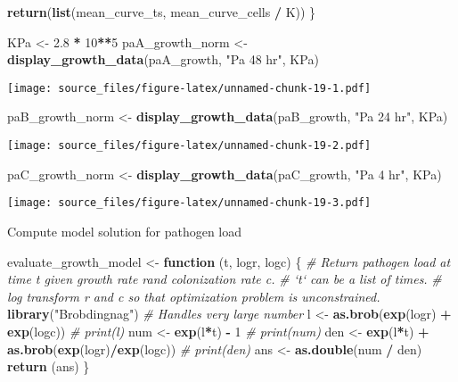 \documentclass[]{article}
\newenvironment{Shaded}{\begin{snugshade}}{\end{snugshade}}
\newcommand{\KeywordTok}[1]{\textcolor[rgb]{0.13,0.29,0.53}{\textbf{#1}}}
\newcommand{\DecValTok}[1]{\textcolor[rgb]{0.00,0.00,0.81}{#1}}
\newcommand{\FloatTok}[1]{\textcolor[rgb]{0.00,0.00,0.81}{#1}}
\newcommand{\StringTok}[1]{\textcolor[rgb]{0.31,0.60,0.02}{#1}}
\newcommand{\CommentTok}[1]{\textcolor[rgb]{0.56,0.35,0.01}{\textit{#1}}}
\newcommand{\ControlFlowTok}[1]{\textcolor[rgb]{0.13,0.29,0.53}{\textbf{#1}}}
\newcommand{\OperatorTok}[1]{\textcolor[rgb]{0.81,0.36,0.00}{\textbf{#1}}}
\newcommand{\NormalTok}[1]{#1}
\begin{document}
\begin{Shaded}
\begin{Highlighting}[]
  \KeywordTok{return}\NormalTok{(}\KeywordTok{list}\NormalTok{(mean_curve_ts, mean_curve_cells }\OperatorTok{/}\StringTok{ }\NormalTok{K))}
\NormalTok{\}}

\NormalTok{KPa <-}\StringTok{ }\FloatTok{2.8} \OperatorTok{*}\StringTok{ }\DecValTok{10}\OperatorTok{**}\DecValTok{5}
\NormalTok{paA_growth_norm <-}\StringTok{ }\KeywordTok{display_growth_data}\NormalTok{(paA_growth, }\StringTok{"Pa 48 hr"}\NormalTok{, KPa)}
\end{Highlighting}
\end{Shaded}

\texttt{[image: source\_files/figure-latex/unnamed-chunk-19-1.pdf]}

\begin{Shaded}
\begin{Highlighting}[]
\NormalTok{paB_growth_norm <-}\StringTok{ }\KeywordTok{display_growth_data}\NormalTok{(paB_growth, }\StringTok{"Pa 24 hr"}\NormalTok{, KPa)}
\end{Highlighting}
\end{Shaded}

\texttt{[image: source\_files/figure-latex/unnamed-chunk-19-2.pdf]}

\begin{Shaded}
\begin{Highlighting}[]
\NormalTok{paC_growth_norm <-}\StringTok{ }\KeywordTok{display_growth_data}\NormalTok{(paC_growth, }\StringTok{"Pa 4 hr"}\NormalTok{, KPa)}
\end{Highlighting}
\end{Shaded}

\texttt{[image: source\_files/figure-latex/unnamed-chunk-19-3.pdf]}

Compute model solution for pathogen load

\begin{Shaded}
\begin{Highlighting}[]
\NormalTok{evaluate_growth_model <-}\StringTok{ }\ControlFlowTok{function}\NormalTok{ (t, logr, logc) \{}
  \CommentTok{# Return pathogen load at time t given growth rate rand colonization rate c.}
  \CommentTok{# `t` can be a list of times.}
  \CommentTok{# log transform r and c so that optimization problem is unconstrained.}
  \KeywordTok{library}\NormalTok{(}\StringTok{"Brobdingnag"}\NormalTok{)  }\CommentTok{# Handles very large number}
\NormalTok{  l <-}\StringTok{ }\KeywordTok{as.brob}\NormalTok{(}\KeywordTok{exp}\NormalTok{(logr) }\OperatorTok{+}\StringTok{ }\KeywordTok{exp}\NormalTok{(logc))}
  \CommentTok{# print(l)}
\NormalTok{  num <-}\StringTok{ }\KeywordTok{exp}\NormalTok{(l}\OperatorTok{*}\NormalTok{t) }\OperatorTok{-}\StringTok{ }\DecValTok{1}
  \CommentTok{# print(num)}
\NormalTok{  den <-}\StringTok{ }\KeywordTok{exp}\NormalTok{(l}\OperatorTok{*}\NormalTok{t) }\OperatorTok{+}\StringTok{ }\KeywordTok{as.brob}\NormalTok{(}\KeywordTok{exp}\NormalTok{(logr)}\OperatorTok{/}\KeywordTok{exp}\NormalTok{(logc))}
  \CommentTok{# print(den)}
\NormalTok{  ans <-}\StringTok{ }\KeywordTok{as.double}\NormalTok{(num }\OperatorTok{/}\StringTok{ }\NormalTok{den)}
  \KeywordTok{return}\NormalTok{ (ans)}
\NormalTok{\}}
\end{Highlighting}
\end{Shaded}
\end{document}
